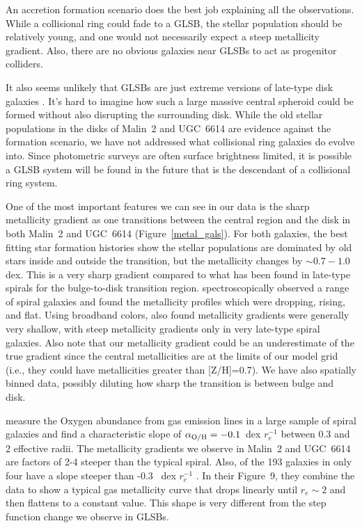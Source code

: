 \documentclass[12pt,preprint]{aastex}
\begin{document}
An accretion formation scenario does the best job explaining all the observations.
While a collisional ring could fade to a GLSB, the stellar population should be relatively young, and one would not necessarily expect a steep metallicity gradient.
Also, there are no obvious galaxies near GLSBs to act as progenitor colliders.


It also seems unlikely that GLSBs are just extreme versions of late-type disk galaxies \citep{Das13}.
It's hard to imagine how such a large massive central spheroid could be formed without also disrupting the surrounding disk.
While the old stellar populations in the disks of Malin~2 and UGC~6614 are evidence against the \citet{Mapelli08} formation scenario, we have not addressed what collisional ring galaxies do evolve into.
Since photometric surveys are often surface brightness limited, it is possible a GLSB system will be found in the future that is the descendant of a collisional ring system.


One of the most important features we can see in our data is the sharp metallicity gradient as one transitions between the central region and the disk in both Malin~2 and UGC~6614 (Figure~\ref{metal_gals}).
For both galaxies, the best fitting star formation histories show the stellar populations are dominated by old stars inside and outside the transition, but the metallicity changes by $\sim0.7-1.0$ dex.
This is a very sharp gradient compared to what has been found in late-type spirals for the bulge-to-disk transition region.
\citet{MacArthur09} spectroscopically observed a range of spiral galaxies and found the metallicity profiles which were dropping, rising, and flat.
Using broadband colors, \citet{MacArthur04} also found metallicity gradients were generally very shallow, with steep metallicity gradients only in very late-type spiral galaxies. Also note that our metallicity gradient could be an underestimate of the true gradient since the central metallicities are at the limits of our model grid (i.e., they could have metallicities greater than [Z/H]=0.7). We have also spatially binned data, possibly diluting how sharp the transition is between bulge and disk.

\citet{Sanchez14} measure the Oxygen abundance from gas emission lines in a large sample of spiral galaxies and find a characteristic slope of $\alpha_{\rm{O/H}} = -0.1$\ dex $r_e^{-1}$ between 0.3 and 2 effective radii.
The metallicity gradients we observe in Malin~2 and UGC~6614 are factors of 2-4 steeper than the typical spiral. Also, of the 193 galaxies in \citet{Sanchez14} only four have a slope steeper than -0.3 \ dex $r_e^{-1}$ \citep[Figure~6]{Sanchez14}.
In their Figure~9, they combine the data to show a typical gas metallicity curve that drops linearly until $r_e\sim2$ and then flattens to a constant value.
This shape is very different from the step function change we observe in GLSBs.
\end{document}
